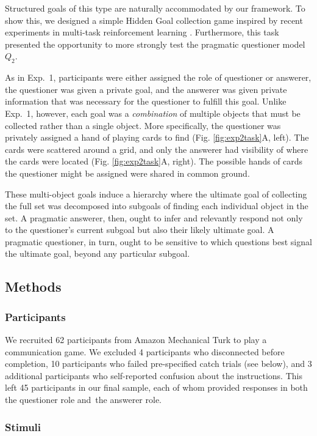 \documentclass[11pt, floatsintext]{apa6}
\begin{document}
Structured goals of this type are naturally accommodated by our framework. 
To show this, we designed a simple Hidden Goal collection game inspired by recent experiments in multi-task reinforcement learning \cite{oh2017zero, andreas2017modular}.
Furthermore, this task presented the opportunity to more strongly test the pragmatic questioner model $Q_2$.


As in Exp.~1, participants were either assigned the role of questioner or answerer, the questioner was given a private goal, and the answerer was given private information that was necessary for the questioner to fulfill this goal.
Unlike Exp.~1, however, each goal was a \emph{combination} of multiple objects that must be collected rather than a single object.
More specifically, the questioner was privately assigned a hand of playing cards to find (Fig. \ref{fig:exp2task}A, left). 
The cards were scattered around a grid, and only the answerer had visibility of where the cards were located (Fig. \ref{fig:exp2task}A, right).
The possible hands of cards the questioner might be assigned were shared in common ground.

These multi-object goals induce a hierarchy where the ultimate goal of collecting the full set was decomposed into subgoals of finding each individual object in the set.
A pragmatic answerer, then, ought to infer and relevantly respond not only to the questioner's current subgoal but also their likely ultimate goal.
A pragmatic questioner, in turn, ought to be sensitive to which questions best signal the ultimate goal, beyond any particular subgoal.


\subsection{Methods}
\subsubsection{Participants}

We recruited 62 participants from Amazon Mechanical Turk to play a communication game.
We excluded 4 participants who disconnected before completion, 10 participants who failed pre-specified catch trials (see below), and 3 additional participants who self-reported confusion about the instructions.
This left 45 participants in our final sample, each of whom provided responses in both the questioner role and the answerer role.

\subsubsection{Stimuli}
\end{document}
